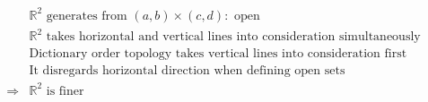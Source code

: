 \documentclass{article}
\begin{document}
\begin{equation*}
    \begin{split}
        &\mathbb{R} ^2\text{ generates from }(a,b)\times(c,d):\text{ open}\\
        &\mathbb{R} ^2\text{ takes horizontal and vertical lines into consideration simultaneously}\\
        &\text{Dictionary order topology takes vertical lines into consideration first}\\
        &\text{It disregards horizontal direction when defining open sets}\\
        \Rightarrow&\mathbb{R} ^2\text{ is finer}\\
    \end{split}
\end{equation*}
\end{document}
